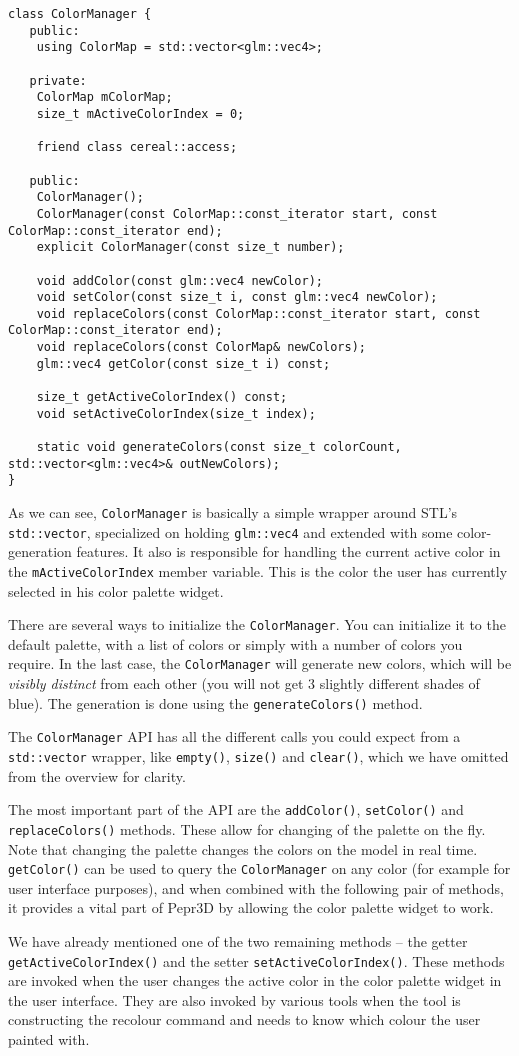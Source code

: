 \begin{lstlisting}
class ColorManager {
   public:
    using ColorMap = std::vector<glm::vec4>;

   private:
    ColorMap mColorMap;
    size_t mActiveColorIndex = 0;

    friend class cereal::access;

   public:
    ColorManager();
    ColorManager(const ColorMap::const_iterator start, const ColorMap::const_iterator end);
    explicit ColorManager(const size_t number);

    void addColor(const glm::vec4 newColor);
    void setColor(const size_t i, const glm::vec4 newColor);
    void replaceColors(const ColorMap::const_iterator start, const ColorMap::const_iterator end);
    void replaceColors(const ColorMap& newColors);
    glm::vec4 getColor(const size_t i) const;

    size_t getActiveColorIndex() const;
    void setActiveColorIndex(size_t index);

    static void generateColors(const size_t colorCount, std::vector<glm::vec4>& outNewColors);
}
\end{lstlisting}

As we can see, \texttt{ColorManager} is basically a simple wrapper around STL's \texttt{std::vector}, specialized on holding \texttt{glm::vec4} and extended with some color-generation features. It also is responsible for handling the current active color in the \texttt{mActiveColorIndex} member variable. This is the color the user has currently selected in his color palette widget.

There are several ways to initialize the \texttt{ColorManager}. You can initialize it to the default palette, with a list of colors or simply with a number of colors you require. In the last case, the \texttt{ColorManager} will generate new colors, which will be \textit{visibly distinct} from each other (you will not get 3 slightly different shades of blue). The generation is done using the \texttt{generateColors()} method.

The \texttt{ColorManager} API has all the different calls you could expect from a \texttt{std::vector} wrapper, like \texttt{empty()}, \texttt{size()} and \texttt{clear()}, which we have omitted from the overview for clarity.

The most important part of the API are the \texttt{addColor()}, \texttt{setColor()} and \texttt{replaceColors()} methods. These allow for changing of the palette on the fly. Note that changing the palette changes the colors on the model in real time. \texttt{getColor()} can be used to query the \texttt{ColorManager} on any color (for example for user interface purposes), and when combined with the following pair of methods, it provides a vital part of Pepr3D by allowing the color palette widget to work.

We have already mentioned one of the two remaining methods -- the getter \texttt{getActiveColorIndex()} and the setter \texttt{setActiveColorIndex()}. These methods are invoked when the user changes the active color in the color palette widget in the user interface. They are also invoked by various tools when the tool is constructing the recolour command and needs to know which colour the user painted with.